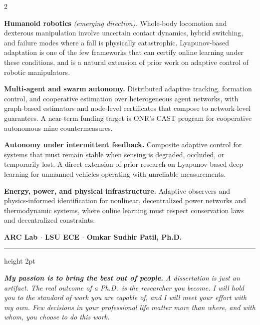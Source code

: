 \documentclass[9pt, letterpaper]{article}
\begin{document}
\begin{multicols}{2}\small

\textbf{Humanoid robotics} \textit{(emerging direction).}
Whole-body locomotion and dexterous manipulation involve uncertain contact dynamics,
hybrid switching, and failure modes where a fall is physically catastrophic.
Lyapunov-based adaptation is one of the few frameworks that can certify online
learning under these conditions, and is a natural extension of prior work on
adaptive control of robotic manipulators.

\textbf{Multi-agent and swarm autonomy.}
Distributed adaptive tracking, formation control, and cooperative estimation over
heterogeneous agent networks, with graph-based estimators and node-level certificates
that compose to network-level guarantees.
A near-term funding target is ONR's CAST program for cooperative autonomous
mine countermeasures.

\columnbreak

\textbf{Autonomy under intermittent feedback.}
Composite adaptive control for systems that must remain stable when sensing is
degraded, occluded, or temporarily lost.
A direct extension of prior research on Lyapunov-based deep learning for unmanned
vehicles operating with unreliable measurements.

\textbf{Energy, power, and physical infrastructure.}
Adaptive observers and physics-informed identification for nonlinear, decentralized
power networks and thermodynamic systems, where online learning must respect
conservation laws and decentralized constraints.

\end{multicols}

\newpage

\begin{center}
{\color{lsupurple}\bfseries\normalsize
  ARC Lab $\cdot$ LSU ECE $\cdot$ Omkar Sudhir Patil, Ph.D.}
\end{center}
\vspace{1pt}
{\color{lsugold}\hrule height 2pt}
\vspace{5pt}

\begin{pullquote}
\small\itshape\color{accentgray}
\textbf{My passion is to bring the best out of people.}
A dissertation is just an artifact. The real outcome of a Ph.D.\ is the
researcher you become.
I will hold you to the standard of work you are capable of, and I will meet your
effort with my own.
Few decisions in your professional life matter more than where, and with whom,
you choose to do this work.
\end{pullquote}
\end{document}
